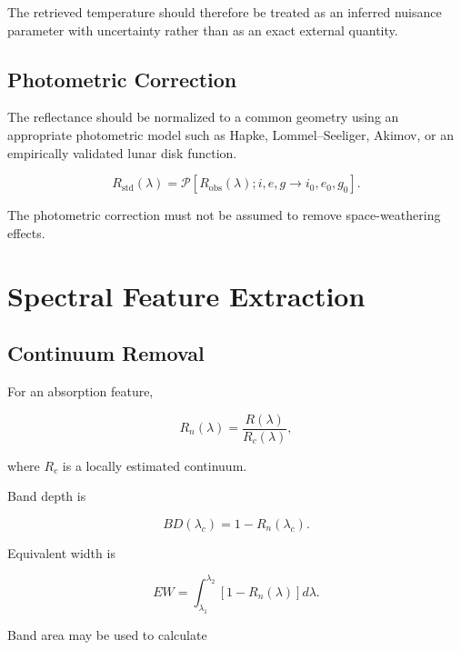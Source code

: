 \documentclass[11pt,a4paper]{article}
\begin{document}
The retrieved temperature should therefore be treated as an inferred nuisance parameter with uncertainty rather than as an exact external quantity.

\subsection{Photometric Correction}

The reflectance should be normalized to a common geometry using an appropriate photometric model such as Hapke, Lommel--Seeliger, Akimov, or an empirically validated lunar disk function.

\begin{equation}
R_{\mathrm{std}}(\lambda)
=
\mathcal{P}
\left[
R_{\mathrm{obs}}(\lambda);
i,e,g
\rightarrow
i_0,e_0,g_0
\right].
\end{equation}

The photometric correction must not be assumed to remove space-weathering effects.

\section{Spectral Feature Extraction}

\subsection{Continuum Removal}

For an absorption feature,

\begin{equation}
R_n(\lambda)
=
\frac{R(\lambda)}{R_c(\lambda)},
\end{equation}

where $R_c$ is a locally estimated continuum.

Band depth is

\begin{equation}
BD(\lambda_c)
=
1-R_n(\lambda_c).
\end{equation}

Equivalent width is

\begin{equation}
EW
=
\int_{\lambda_1}^{\lambda_2}
\left[1-R_n(\lambda)\right]d\lambda.
\end{equation}

Band area may be used to calculate
\end{document}
